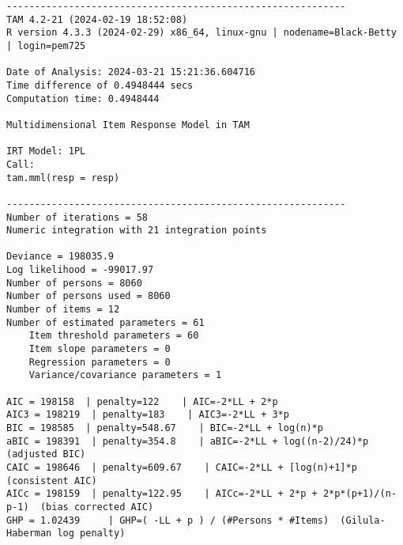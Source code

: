 \documentclass[
  letterpaper,
  DIV=11,
  numbers=noendperiod]{scrartcl}
\begin{document}
\begin{verbatim}
------------------------------------------------------------
TAM 4.2-21 (2024-02-19 18:52:08) 
R version 4.3.3 (2024-02-29) x86_64, linux-gnu | nodename=Black-Betty | login=pem725 

Date of Analysis: 2024-03-21 15:21:36.604716 
Time difference of 0.4948444 secs
Computation time: 0.4948444 

Multidimensional Item Response Model in TAM 

IRT Model: 1PL
Call:
tam.mml(resp = resp)

------------------------------------------------------------
Number of iterations = 58 
Numeric integration with 21 integration points

Deviance = 198035.9 
Log likelihood = -99017.97 
Number of persons = 8060 
Number of persons used = 8060 
Number of items = 12 
Number of estimated parameters = 61 
    Item threshold parameters = 60 
    Item slope parameters = 0 
    Regression parameters = 0 
    Variance/covariance parameters = 1 

AIC = 198158  | penalty=122    | AIC=-2*LL + 2*p 
AIC3 = 198219  | penalty=183    | AIC3=-2*LL + 3*p 
BIC = 198585  | penalty=548.67    | BIC=-2*LL + log(n)*p 
aBIC = 198391  | penalty=354.8    | aBIC=-2*LL + log((n-2)/24)*p  (adjusted BIC) 
CAIC = 198646  | penalty=609.67    | CAIC=-2*LL + [log(n)+1]*p  (consistent AIC) 
AICc = 198159  | penalty=122.95    | AICc=-2*LL + 2*p + 2*p*(p+1)/(n-p-1)  (bias corrected AIC) 
GHP = 1.02439     | GHP=( -LL + p ) / (#Persons * #Items)  (Gilula-Haberman log penalty) 


\end{verbatim}
\end{document}
